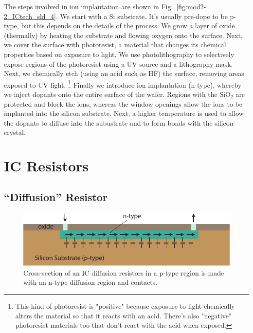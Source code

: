 The steps involved in ion implantation are shown in Fig.~\ref{fig:mod2-2_ICtech_sld_4}.  We start with a Si substrate.  It's usually pre-dope to be p-type, but this depends on the details of the process.  We grow a layer of oxide (thermally) by heating the substrate and flowing oxygen onto the surface.  Next, we cover the surface with photoresist, a material that changes its chemical properties based on exposure to light.  We use photolithography to selectively expose regions of the photoresist using a UV source and a lithography mask.  Next, we chemically etch (using an acid such as HF)  the surface, removing areas exposed to UV light.  \footnote{This kind of photoresist is "positive" because exposure to light chemically alters the material so that it reacts with an acid. There's also  "negative" photoresist materials too that don't react with the acid when exposed.}    Finally we introduce ion implantation (n-type), whereby we inject dopants onto the entire surface of the wafer.  Regions with the SiO$_2$ are protected and block the ions, whereas the window openings allow the ions to be implanted into the silicon substrate.  Next, a higher temperature is used to allow the dopants to diffuse into the subustrate and to form bonds with the silicon crystal. 





\section{IC Resistors}



\subsection{“Diffusion” Resistor}

\begin{figure}[tb]
\begin{center}
\includegraphics[width=.7\columnwidth]{diff_resistor}
\end{center}
\caption{Cross-section of an IC diffusion resistors in a p-type region is made with an n-type diffusion region and contacts.} \label{fig:mod2-2_ICtech_sld_5}
\end{figure}

